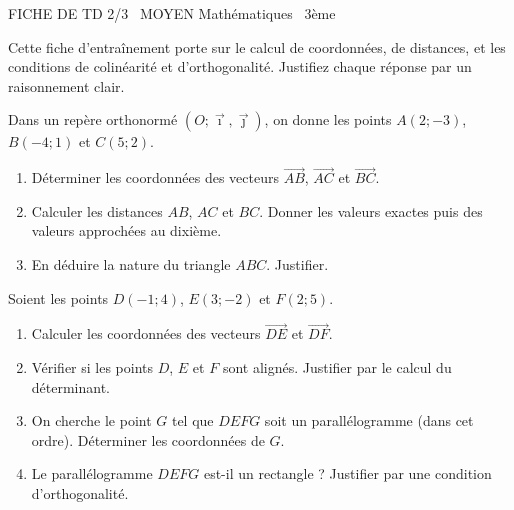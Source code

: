 \documentclass[11pt]{article}
\begin{document}
\begin{tcolorbox}[enhanced,colback=popink,colframe=popink,arc=10pt,boxrule=0pt,left=12pt,right=12pt,top=9pt,bottom=9pt]
{\color{white}\popxbold\small FICHE DE TD 2/3 \textbullet\ MOYEN \hfill Mathématiques \textbullet\ 3ème\par}
\end{tcolorbox}
\vspace{4pt}
Cette fiche d'entraînement porte sur le calcul de coordonnées, de distances, et les conditions de colinéarité et d'orthogonalité. Justifiez chaque réponse par un raisonnement clair.

\begin{exercice}
Dans un repère orthonormé $(O;\vec{\imath},\vec{\jmath})$, on donne les points $A(2; -3)$, $B(-4; 1)$ et $C(5; 2)$.
\begin{enumerate}
    \item Déterminer les coordonnées des vecteurs $\overrightarrow{AB}$, $\overrightarrow{AC}$ et $\overrightarrow{BC}$.
    \item Calculer les distances $AB$, $AC$ et $BC$. Donner les valeurs exactes puis des valeurs approchées au dixième.
    \item En déduire la nature du triangle $ABC$. Justifier.
\end{enumerate}
\end{exercice}

\begin{exercice}
Soient les points $D(-1; 4)$, $E(3; -2)$ et $F(2; 5)$.
\begin{enumerate}
    \item Calculer les coordonnées des vecteurs $\overrightarrow{DE}$ et $\overrightarrow{DF}$.
    \item Vérifier si les points $D$, $E$ et $F$ sont alignés. Justifier par le calcul du déterminant.
    \item On cherche le point $G$ tel que $DEFG$ soit un parallélogramme (dans cet ordre). Déterminer les coordonnées de $G$.
    \item Le parallélogramme $DEFG$ est-il un rectangle ? Justifier par une condition d'orthogonalité.
\end{enumerate}
\end{exercice}
\end{document}
